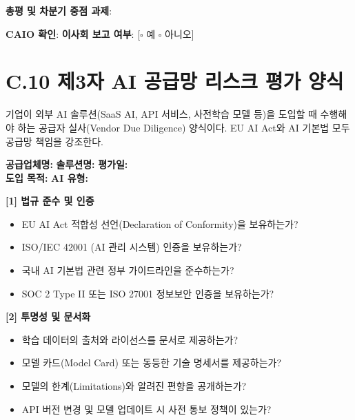 \begin{tcolorbox}[colback=green!5, colframe=green!60, title={[Template C.9] AI 거버넌스 KPI 분기 대시보드}]
\textbf{총평 및 차분기 중점 과제}: \underline{\hspace{10cm}}

\textbf{CAIO 확인}: \underline{\hspace{3cm}} \quad \textbf{이사회 보고 여부}: [$\square$ 예 $\square$ 아니오]
\end{tcolorbox}

\section*{C.10 제3자 AI 공급망 리스크 평가 양식}

기업이 외부 AI 솔루션(SaaS AI, API 서비스, 사전학습 모델 등)을 도입할 때 수행해야 하는 공급자 실사(Vendor Due Diligence) 양식이다. EU AI Act와 AI 기본법 모두 공급망 책임을 강조한다.

\begin{tcolorbox}[colback=purple!5, colframe=purple!60, title={[Template C.10] AI 공급망 리스크 평가 (Vendor Due Diligence)}]
\textbf{공급업체명:} \underline{\hspace{3cm}} \quad \textbf{솔루션명:} \underline{\hspace{3cm}} \quad \textbf{평가일:} \underline{\hspace{2cm}} \\
\textbf{도입 목적:} \underline{\hspace{8cm}} \quad \textbf{AI 유형:} \underline{\hspace{2cm}}

\vspace{0.5em}
\textbf{[1] 법규 준수 및 인증}
\begin{itemize}
    \item[$\square$] EU AI Act 적합성 선언(Declaration of Conformity)을 보유하는가?
    \item[$\square$] ISO/IEC 42001 (AI 관리 시스템) 인증을 보유하는가?
    \item[$\square$] 국내 AI 기본법 관련 정부 가이드라인을 준수하는가?
    \item[$\square$] SOC 2 Type II 또는 ISO 27001 정보보안 인증을 보유하는가?
\end{itemize}

\textbf{[2] 투명성 및 문서화}
\begin{itemize}
    \item[$\square$] 학습 데이터의 출처와 라이선스를 문서로 제공하는가?
    \item[$\square$] 모델 카드(Model Card) 또는 동등한 기술 명세서를 제공하는가?
    \item[$\square$] 모델의 한계(Limitations)와 알려진 편향을 공개하는가?
    \item[$\square$] API 버전 변경 및 모델 업데이트 시 사전 통보 정책이 있는가?
\end{itemize}


\end{tcolorbox}
